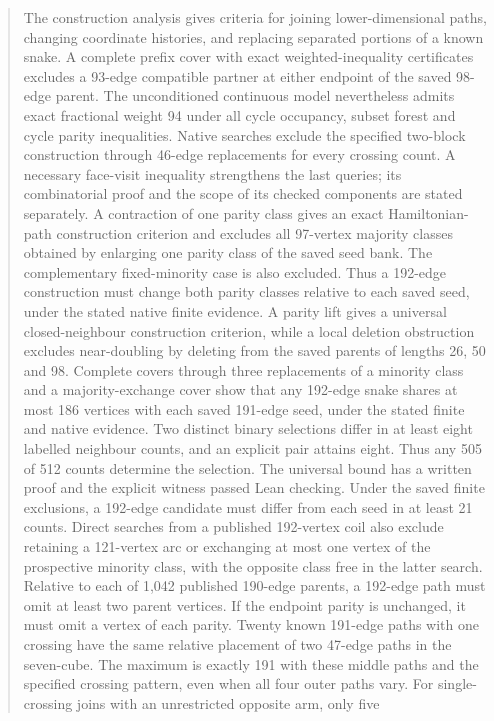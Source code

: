 \documentclass[11pt,a4paper]{article}
\theoremstyle{definition}
\theoremstyle{remark}
\begin{document}
\begin{abstract}
The construction analysis gives criteria for joining lower-dimensional
paths, changing coordinate histories, and replacing separated portions
of a known snake. A complete prefix cover with exact weighted-inequality
certificates excludes a 93-edge compatible partner at either endpoint
of the saved 98-edge parent.
The unconditioned continuous model nevertheless admits exact fractional
weight 94 under all cycle occupancy, subset forest and cycle parity
inequalities. Native searches exclude the specified two-block construction through
46-edge replacements for every crossing count. A necessary face-visit
inequality strengthens the last queries; its combinatorial proof and
the scope of its checked components are stated separately. A contraction
of one parity class gives an exact Hamiltonian-path construction criterion
and excludes all 97-vertex majority classes obtained by enlarging one
parity class of the saved seed bank. The complementary fixed-minority
case is also excluded. Thus a 192-edge construction must change both
parity classes relative to each saved seed, under the stated native
finite evidence. A parity lift gives a universal closed-neighbour
construction criterion, while a local deletion obstruction excludes
near-doubling by deleting from the saved parents of lengths 26, 50 and 98.
Complete covers through three replacements of a minority class and a
majority-exchange cover show that any 192-edge snake shares at most 186
vertices with each saved
191-edge seed, under the stated finite and native evidence.
Two distinct binary selections differ in at least eight labelled neighbour
counts, and an explicit pair attains eight. Thus any 505 of 512 counts
determine the selection. The universal bound has a written proof and the
explicit witness passed Lean checking. Under the saved finite exclusions,
a 192-edge candidate must differ from each seed in at least 21 counts.
Direct searches from a published 192-vertex coil also exclude retaining
a 121-vertex arc or exchanging at most one vertex of the prospective
minority class, with the opposite class free in the latter search.
Relative to each of 1,042 published 190-edge parents, a 192-edge path
must omit at least two parent vertices. If the endpoint parity is
unchanged, it must omit a vertex of each parity.
Twenty known 191-edge paths with one crossing have the same relative
placement of two 47-edge paths in the seven-cube. The maximum is
exactly 191 with these middle paths and the specified crossing pattern,
even when all four outer paths vary.
For single-crossing joins with an unrestricted opposite arm, only five

\end{abstract}
\end{document}
